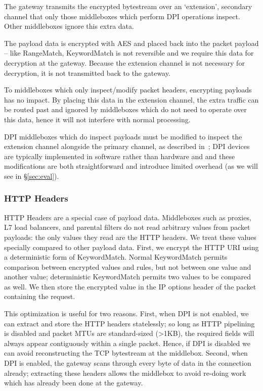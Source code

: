 The gateway transmits the encrypted bytestream over an `extension', secondary channel that only those middleboxes which perform DPI operations inspect. 
Other middleboxes ignore this extra data.



 The payload data is encrypted with AES and placed back into the packet payload -- like RangeMatch, KeywordMatch is not reversible and we require this data for decryption at the gateway.
Because the extension channel is not necessary for decryption, it is not transmitted back to the gateway.

 To middleboxes which only inspect/modify packet headers, encrypting payloads has no impact. 
By placing this data in the extension channel, the extra traffic can be routed past and ignored by middleboxes which do not need to operate over this data, hence it will not interfere with normal processing. 

DPI middleboxes which do inspect payloads must be modified to inspect the extension channel alongside the primary channel, as described in~\cite{blindbox}; DPI devices are typically implemented in software rather than hardware and and these modifications are both straightforward and introduce limited overhead (as we will see in \S\ref{sec:eval}). 

\subsubsection{HTTP Headers} 

HTTP Headers are a special case of payload data.
Middleboxes such as proxies, L7 load balancers, and parental filters do not read arbitrary values from packet payloads: the only values they read are the HTTP headers.
We treat these values specially compared to other payload data.
First, we encrypt the HTTP URI using a deterministic form of KeywordMatch.
Normal KeywordMatch permits comparison between encrypted values and rules, but not between one value and another value; deterministic KeywordMatch permits two values to be compared as well.
We then store the encrypted value in the IP options header of the packet containing the request.

This optimization is useful for two reasons. 
First, when DPI is not enabled, we can extract and store the HTTP headers statelessly; so long as HTTP pipelining is disabled and packet MTUs are standard-sized (>1KB), the required fields will always appear contiguously within a single packet.
Hence, if DPI is disabled we can avoid reconstructing the TCP bytestream at the middlebox.
Second, when DPI is enabled, the gateway scans through every byte of data in the connection already;  extracting these headers allows the middlebox to avoid re-doing work which has already been done at the gateway.


